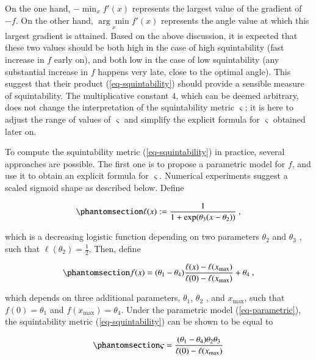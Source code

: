 \documentclass[
  number,
  preprint,
  3p]{elsarticle}
\begin{document}
On the one hand, \(-\min_{x}f'(x)\) represents the largest value of the
gradient of \(-f\). On the other hand, \(\underset{x}{\arg\min}f'(x)\)
represents the angle value at which this largest gradient is attained.
Based on the above discussion, it is expected that these two values
should be both high in the case of high squintability (fast increase in
\(f\) early on), and both low in the case of low squintability (any
substantial increase in \(f\) happens very late, close to the optimal
angle). This suggest that their product (\ref{eq-squintability}) should
provide a sensible measure of squintability. The multiplicative constant
\(4\), which can be deemed arbitrary, does not change the interpretation
of the squintability metric \(\varsigma\); it is here to adjust the
range of values of \(\varsigma\) and simplify the explicit formula for
\(\varsigma\) obtained later on.

To compute the squintability metric (\ref{eq-squintability}) in
practice, several approaches are possible. The first one is to propose a
parametric model for \(f\), and use it to obtain an explicit formula for
\(\varsigma\). Numerical experiments suggest a scaled sigmoid shape as
described below. Define

\begin{equation}\phantomsection\label{eq-logistic}{
\ell(x):=\frac{1}{1+\exp(\theta_{3}(x-\theta_{2}))}\ ,
}\end{equation}

which is a decreasing logistic function depending on two parameters
\(\theta_2\) and \(\theta_3\) , such that
\(\ell(\theta_{2})=\frac{1}{2}\). Then, define

\begin{equation}\phantomsection\label{eq-parametric}{
f(x)=(\theta_{1}-\theta_{4})\frac{\ell(x)-\ell(x_{\max})}{\ell(0)-\ell(x_{\max})}+\theta_{4}\ ,
}\end{equation}

which depends on three additional parameters, \(\theta_1\), \(\theta_2\)
, and \(x_{\max}\), such that \(f(0)=\theta_1\) and
\(f(x_{\max})=\theta_4\). Under the parametric model
(\ref{eq-parametric}), the squintability metric (\ref{eq-squintability})
can be shown to be equal to

\begin{equation}\phantomsection\label{eq-squintability-parametric}{
\varsigma=\frac{(\theta_{1}-\theta_{4})\theta_{2}\theta_{3}}{\ell(0)-\ell(x_{\max})}
}\end{equation}
\end{document}
